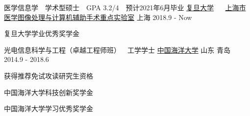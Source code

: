 

\begin{cventries}

  \cventry
    {医学信息学~~学术型硕士~~GPA 3.2/4~~预计2021年6月毕业} %
    {  \href{https://www.fudan.edu.cn/}{复旦大学} ~~ \href{http://www.fudanmiccai.org/}{上海市医学图像处理与计算机辅助手术重点实验室}} %
    {上海} %
    {2018.9 - Now} %
    {
      \begin{cvitems} %
        \item {复旦大学学业优秀奖学金}
      \end{cvitems}
    }

  \cventry
    {光电信息科学与工程（卓越工程师班）~~工学学士} %
    { \href{http://www.ouc.edu.cn/}{中国海洋大学} } %
    {山东 \textbullet 青岛} %
    {2014.9 - 2018.6} %
    {
      \begin{cvitems} %
        \item {获得推荐免试攻读研究生资格}
        \item {中国海洋大学科技创新奖学金}
        \item {中国海洋大学学习优秀奖学金}
      \end{cvitems}
    }


\end{cventries}
